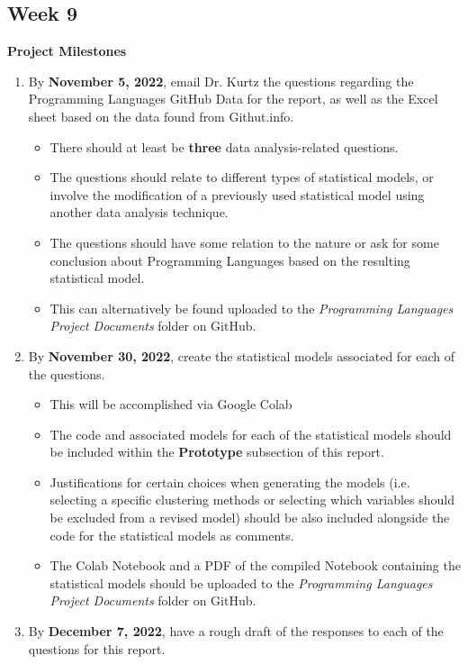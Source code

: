 \documentclass{article}
\theoremstyle{theorem}
\theoremstyle{definition}
\theoremstyle{remark}
\begin{document}
\subsection{Week 9}
\textbf{Project Milestones}
\begin{enumerate}
    \item By \textbf{November 5, 2022}, email Dr. Kurtz the questions regarding the Programming Languages GitHub Data for the report, as well as the Excel sheet based on the data found from Githut.info.
    \begin{itemize}
        \item There should at least be \textbf{three} data analysis-related questions.
        \item The questions should relate to different types of statistical models, or involve the modification of a previously used statistical model using another data analysis technique.
        \item The questions should have some relation to the nature or ask for some conclusion about Programming Languages based on the resulting statistical model.
        \item This can alternatively be found uploaded to the \textit{Programming Languages Project Documents} folder on GitHub.
    \end{itemize}
    \item By \textbf{November 30, 2022}, create the statistical models associated for each of the questions.
    \begin{itemize}
        \item This will be accomplished via Google Colab
        \item The code and associated models for each of the statistical models should be included within the \textbf{Prototype} subsection of this report.
        \item Justifications for certain choices when generating the models (i.e. selecting a specific clustering methods or selecting which variables should be excluded from a revised model) should be also included alongside the code for the statistical models as comments.
        \item The Colab Notebook and a PDF of the compiled Notebook containing the statistical models should be uploaded to the \textit{Programming Languages Project Documents} folder on GitHub.
    \end{itemize}
    \item By \textbf{December 7, 2022}, have a rough draft of the responses to each of the questions for this report.

\end{enumerate}
\end{document}
